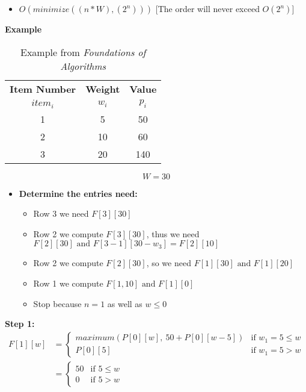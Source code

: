 \begin{itemize}
\begin{itemize}
\begin{itemize}
\begin{equation*}
						\right.
					\end{equation*}
					\item $O(minimize((n*W),(2^n)))$ [The order will never exceed $O(2^n)$]
				\end{itemize}
				\textbf{Example}
				\begin{table}[h!]
					\begin{center}
						\caption{Example from \textit{Foundations of Algorithms} \cite{neopolitan_foundations_nodate}}
						\label{tab:example3}
						\begin{tabular}{c|c|c}
							\toprule %
							\textbf{Item Number} & \textbf{Weight} & \textbf{Value}\\
							$item_i$ & $w_i$ & $p_i$ \\
							\midrule %
							1 & 5 & 50 \\
							2 & 10 & 60 \\
							3 & 20 & 140 \\ 
						\end{tabular}
					\end{center} \vspace{12pt}
					$$
					W = 30
					$$
				\end{table}
				\begin{itemize}
				\item \textbf{Determine the entries need:} 
				\begin{itemize}
					\item Row 3 we need $F[3][30]$
					\item Row 2 we compute $F[3][30]$, thus we need $F[2][30] \mbox{ and } F[3-1][30-w_3] = F[2][10]$
					\item Row 2 we compute $F[2][30]$, so we need $F[1][30] \mbox{ and } F[1][20]$ 
					\item Row 1 we compute $F[1, 10] \mbox{ and } F[1][0]$
					\item Stop because $n = 1$ as well as $w \leq 0$
				\end{itemize}
			\end{itemize}
			\textbf{Step 1: }
			\begin{align*}
				F[1][w] &= 
				\begin{cases}
					maximum(P[0][w], \ 50 + P[0][w-5]) & \mbox{if }  w_1 = 5 \leq w \\
					P[0][5] & \mbox{if } w_1 = 5 > w
				\end{cases} \\
				&= 
				\begin{cases}
					50 & \mbox{if }  5 \leq w \\
					0 & \mbox{if } 5 > w
				\end{cases}
			\end{align*}
			

\end{itemize}
\end{itemize}
